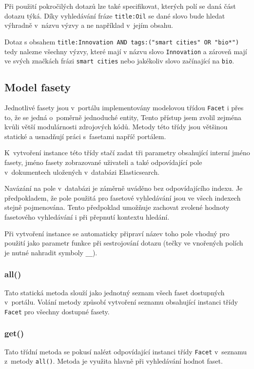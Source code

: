Při použití pokročilých dotazů lze také specifikovat, kterých polí se daná část dotazu týká. Díky vyhledávání fráze \texttt{title:Oil} se dané slovo bude hledat výhradně v~názvu výzvy a ne například v~jejím obsahu.


Dotaz s obsahem \texttt{title:Innovation AND tags:("smart cities"~OR "bio*")} tedy nalezne všechny výzvy, které mají v názvu slovo \texttt{Innovation} a zároveň mají ve svých značkách frázi \texttt{smart cities} nebo jakékoliv slovo začínající na \texttt{bio}.

\subsection{Model fasety}
Jednotlivé fasety jsou v~portálu implementovány modelovou třídou \texttt{Facet} i přes to, že se jedná o~poměrně jednoduché entity, Tento přístup jsem zvolil zejména kvůli větší modulárnosti zdrojových kódů. Metody této třídy jsou většinou statické a usnadňují práci s~fasetami napříč portálem.

K~vytvoření instance této třídy stačí zadat tři parametry obsahující interní jméno fasety, jméno fasety zobrazované uživateli a také odpovídající pole v~dokumentech uložených v~databázi Elasticsearch. 

Navázání na pole v~databázi je záměrně uváděno bez odpovídajícího indexu. Je předpokladem, že pole použitá pro fasetové vyhledávání jsou ve všech indexech stejně pojmenována. Tento předpoklad umožňuje zachovat zvolené hodnoty fasetového vyhledávání i při přepnutí kontextu hledání. 

Při vytvoření instance se automaticky připraví název toho pole vhodný pro použití jako parametr funkce při sestrojování dotazu (tečky ve vnořených polích je nutné nahradit symboly \texttt{\_\_}). 

\subsubsection*{all()}
Tato statická metoda slouží jako jednotný seznam všech faset dostupných v~portálu. Volání metody způsobí vytvoření seznamu obsahující instanci třídy \texttt{Facet} pro všechny dostupné fasety.

\subsubsection*{get()}
Tato třídní metoda se pokusí nalézt odpovídající instanci třídy \texttt{Facet} v~seznamu z~metody \texttt{all()}. Metoda je využita hlavně při vyhledávání hodnot faset.

